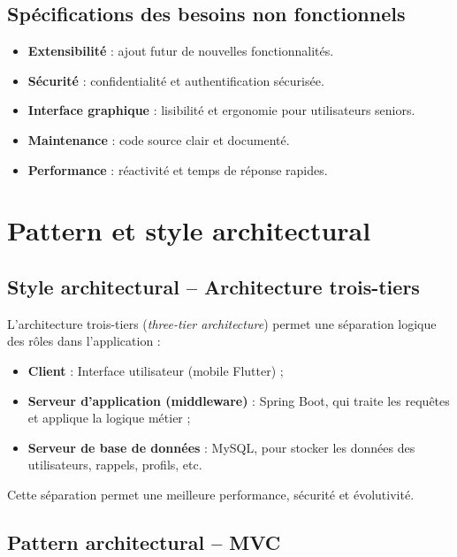 \documentclass[12pt,a4paper]{report}
\begin{document}
\subsection{Spécifications des besoins non fonctionnels}

\begin{itemize}
    \item \textbf{Extensibilité} : ajout futur de nouvelles fonctionnalités.
    \item \textbf{Sécurité} : confidentialité et authentification sécurisée.
    \item \textbf{Interface graphique} : lisibilité et ergonomie pour utilisateurs seniors.
    \item \textbf{Maintenance} : code source clair et documenté.
    \item \textbf{Performance} : réactivité et temps de réponse rapides.
\end{itemize}

\section{Pattern et style architectural}

\subsection{Style architectural – Architecture trois-tiers}

L’architecture trois-tiers (\textit{three-tier architecture}) permet une séparation logique des rôles dans l’application :

\begin{itemize}
    \item \textbf{Client} : Interface utilisateur (mobile Flutter) ;
    \item \textbf{Serveur d'application (middleware)} : Spring Boot, qui traite les requêtes et applique la logique métier ;
    \item \textbf{Serveur de base de données} : MySQL, pour stocker les données des utilisateurs, rappels, profils, etc.
\end{itemize}

Cette séparation permet une meilleure performance, sécurité et évolutivité.

\subsection{Pattern architectural – MVC}
\end{document}
